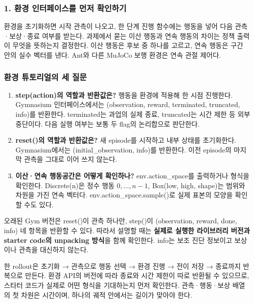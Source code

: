 \documentclass[11pt,a4paper]{article}
\begin{document}
\subsubsection{1. 환경 인터페이스를 먼저 확인하기}

환경을 초기화하면 시작 관측이 나오고, 한 단계 진행 함수에는 행동을 넣어 다음 관측·보상·종료 여부를 받는다. 과제에서 묻는 이산 행동과 연속 행동의 차이는 정책 출력이 무엇을 뜻하는지 결정한다. 이산 행동은 후보 중 하나를 고르고, 연속 행동은 구간 안의 실수 벡터를 낸다. Ant와 다른 MuJoCo 보행 환경은 연속 관절 제어다.\par

\subsubsection{환경 튜토리얼의 세 질문}

\begin{enumerate}
\item \textbf{step(action)의 역할과 반환값은?} 행동을 환경에 적용해 한 시점 진행한다. Gymnasium 인터페이스에서는 (observation, reward, terminated, truncated, info)를 반환한다. terminated는 과업의 실제 종료, truncated는 시간 제한 등 외부 중단이다. 다음 실행 여부는 보통 두 flag의 논리합으로 판단한다.
\item \textbf{reset()의 역할과 반환값은?} 새 episode를 시작하고 내부 상태를 초기화한다. Gymnasium에서는 (initial\_observation, info)를 반환한다. 이전 episode의 마지막 관측을 그대로 이어 쓰지 않는다.
\item \textbf{이산·연속 행동공간은 어떻게 확인하나?} env.action\_space를 출력하거나 형식을 확인한다. Discrete(n)은 정수 행동 $0,\ldots,n-1$, Box(low, high, shape)는 범위와 차원을 가진 연속 벡터다. env.action\_space.sample()로 실제 표본의 모양을 확인할 수도 있다.
\end{enumerate}

오래된 Gym 버전은 reset()이 관측 하나만, step()이 (observation, reward, done, info) 네 항목을 반환할 수 있다. 따라서 설명할 때는 \textbf{실제로 실행한 라이브러리 버전과 starter code의 unpacking 방식}을 함께 확인한다. info는 보조 진단 정보이고 보상이나 관측을 대신하지 않는다.\par

한 rollout은 초기화 → 관측으로 행동 선택 → 환경 진행 → 전이 저장 → 종료까지 반복으로 만든다. 환경 API의 버전에 따라 종료와 시간 제한이 따로 반환될 수 있으므로, 스타터 코드가 실제로 어떤 형식을 기대하는지 먼저 확인한다. 관측·행동·보상 배열의 첫 차원은 시간이며, 하나의 궤적 안에서는 길이가 맞아야 한다.\par
\end{document}
